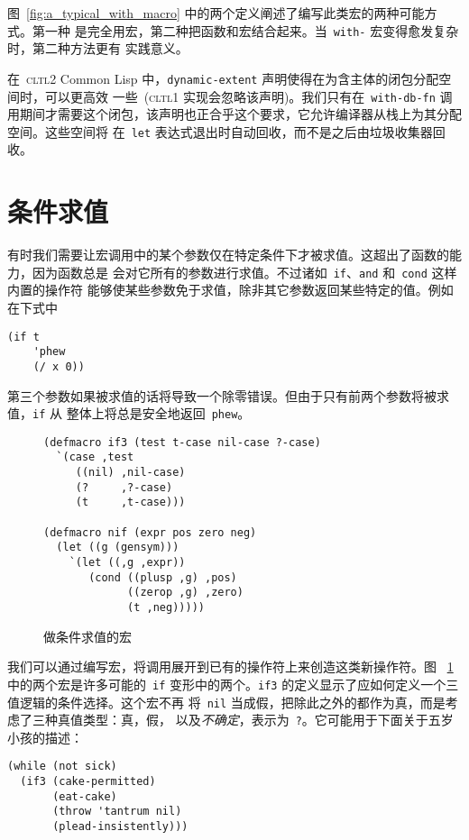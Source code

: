图~\ref{fig:a_typical_with_macro} 中的两个定义阐述了编写此类宏的两种可能方式。第一种
是完全用宏，第二种把函数和宏结合起来。当~\texttt{with-} 宏变得愈发复杂时，第二种方法更有
实践意义。

在~\textsc{cltl}2 Common Lisp 中，\texttt{dynamic-extent} 声明使得在为含主体的闭包分配空间时，可以更高效
一些~(\textsc{cltl}1 实现会忽略该声明)。我们只有在~\texttt{with-db-fn}
调用期间才需要这个闭包，该声明也正合乎这个要求，它允许编译器从栈上为其分配
空间。这些空间将
在~\texttt{let} 表达式退出时自动回收，而不是之后由垃圾收集器回收。

\section{条件求值}
\label{sec:conditional_evaluation}

有时我们需要让宏调用中的某个参数仅在特定条件下才被求值。这超出了函数的能力，因为函数总是
会对它所有的参数进行求值。不过诸如~\texttt{if}、\texttt{and} 和~\texttt{cond} 这样内置的操作符
能够使某些参数免于求值，除非其它参数返回某些特定的值。例如在下式中
\begin{lstlisting}
(if t
    'phew
    (/ x 0))
\end{lstlisting}
第三个参数如果被求值的话将导致一个除零错误。但由于只有前两个参数将被求值，\texttt{if} 从
整体上将总是安全地返回~\texttt{phew}。

\begin{figure}
\begin{lstlisting}
(defmacro if3 (test t-case nil-case ?-case)
  `(case ,test
     ((nil) ,nil-case)
     (?     ,?-case)
     (t     ,t-case)))

(defmacro nif (expr pos zero neg)
  (let ((g (gensym)))
    `(let ((,g ,expr))
       (cond ((plusp ,g) ,pos)
             ((zerop ,g) ,zero)
             (t ,neg)))))
\end{lstlisting}
  \caption{做条件求值的宏}
  \label{fig:macros_for_conditional_evaluation}
\end{figure}

我们可以通过编写宏，将调用展开到已有的操作符上来创造这类新操作符。图
~\ref{fig:macros_for_conditional_evaluation} 中的两个宏是许多可能的~\texttt{if}
变形中的两个。\texttt{if3} 的定义显示了应如何定义一个三值逻辑的条件选择。这个宏不再
将~\texttt{nil} 当成假，把除此之外的都作为真，而是考虑了三种真值类型：真，假，
以及\emph{不确定}，表示为~\verb|?|。它可能用于下面关于五岁小孩的描述：
\begin{lstlisting}
(while (not sick)
  (if3 (cake-permitted)
       (eat-cake)
       (throw 'tantrum nil)
       (plead-insistently)))
\end{lstlisting}

